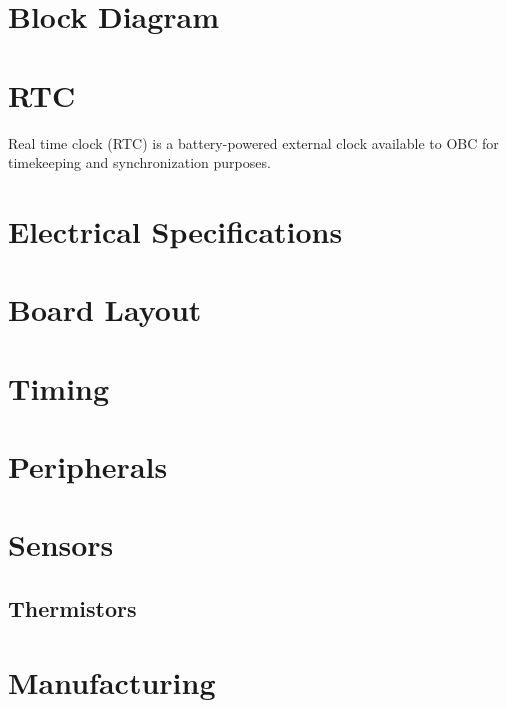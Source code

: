 \documentclass[10pt]{../datasheet}
\begin{document}
\section{Block Diagram}

\section{RTC}

Real time clock (RTC) is a battery-powered external clock available to OBC for
timekeeping and synchronization purposes.

\section{Electrical Specifications}
\section{Board Layout}
\section{Timing}
\section{Peripherals}
\section{Sensors}
\subsection{Thermistors}
\section{Manufacturing}
\end{document}
